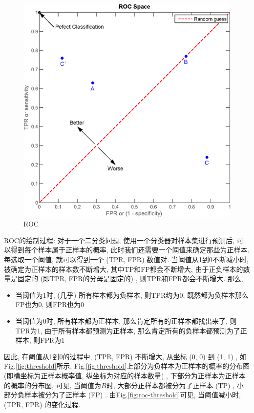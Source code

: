 \begin{figure}[h]
	\centering
	\includegraphics[width=.6\textwidth]{pics/roc.png}
	\caption{ROC}
	\label{fig:roc}
\end{figure}
ROC的绘制过程: 对于一个二分类问题, 使用一个分类器对样本集进行预测后, 可以得到每个样本属于正样本的概率, 此时我们还需要一个阈值来确定那些为正样本. 每选取一个阈值, 就可以得到一个 (TPR, FPR) 数值对. 当阈值从1到0不断减小时, 被确定为正样本的样本数不断增大, 其中TP和FP都会不断增大, 由于正负样本的数量是固定的 (即TPR, FPR的分母是固定的) , 则TPR和FPR都会不断增大. 那么, 
\begin{itemize}
	\item 当阈值为1时,  (几乎) 所有样本都为负样本, 则TPR约为0, 既然都为负样本那么FP也为0, 则FPR也为0
	\item 当阈值为0时, 所有样本都为正样本, 那么肯定所有的正样本都找出来了, 则TPR为1, 由于所有样本都预测为正样本, 那么肯定所有的负样本都预测为了正样本, 则FPR为1
\end{itemize}
因此, 在阈值从1到0的过程中,  (TPR, FPR) 不断增大, 从坐标 (0, 0) 到 (1, 1) , 如Fig.\ref{fig:threshold}所示, Fig.\ref{fig:threshold}上部分为负样本为正样本的概率的分布图 (即横坐标为正样本概率值, 纵坐标为对应的样本数量) , 下部分为正样本为正样本的概率的分布图, 可见, 当阈值为$B$时, 大部分正样本都被分为了正样本 (TP) , 小部分负样本被分为了正样本 (FP) . 由Fig.\ref{fig:roc-threshold}可见, 当阈值减小时,  (TPR, FPR) 的变化过程. 

